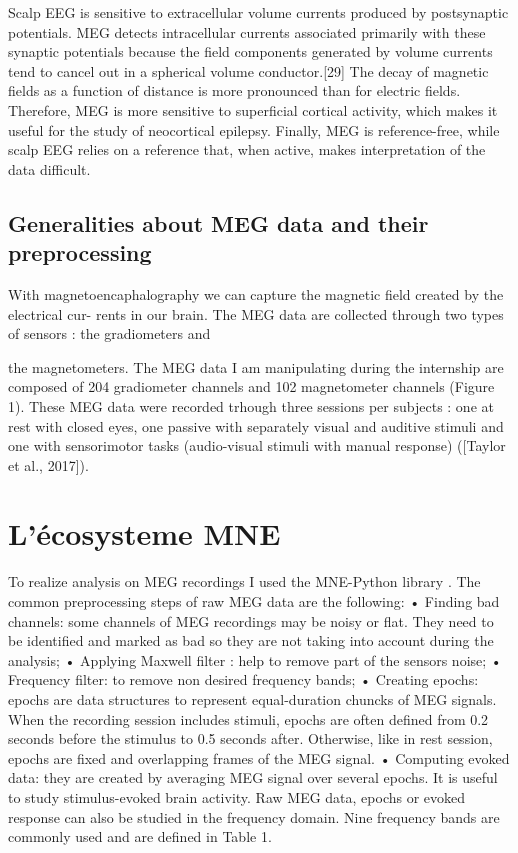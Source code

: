 Scalp EEG is sensitive to extracellular volume currents produced by postsynaptic potentials. MEG detects intracellular currents associated primarily with these synaptic potentials because the field components generated by volume currents tend to cancel out in a spherical volume conductor.[29] The decay of magnetic fields as a function of distance is more pronounced than for electric fields. Therefore, MEG is more sensitive to superficial cortical activity, which makes it useful for the study of neocortical epilepsy. Finally, MEG is reference-free, while scalp EEG relies on a reference that, when active, makes interpretation of the data difficult.


\subsection{Generalities about MEG data and their preprocessing}

With magnetoencaphalography we can capture the magnetic field created by the electrical cur-
rents in our brain. The MEG data are collected through two types of sensors : the gradiometers and

the magnetometers. The MEG data I am manipulating during the internship are composed of 204
gradiometer channels and 102 magnetometer channels (Figure 1). These MEG data were recorded
trhough three sessions per subjects : one at rest with closed eyes, one passive with separately visual
and auditive stimuli and one with sensorimotor tasks (audio-visual stimuli with manual response)
([Taylor et al., 2017]).


\section{L'écosysteme MNE}

To realize analysis on MEG recordings I used the MNE-Python library \cite{GramfortEtAl2013a}.
The common preprocessing steps of raw MEG data are the following:
• Finding bad channels: some channels of MEG recordings may be noisy or flat. They need to
be identified and marked as bad so they are not taking into account during the analysis;
• Applying Maxwell filter : help to remove part of the sensors noise;
• Frequency filter: to remove non desired frequency bands;
• Creating epochs: epochs are data structures to represent equal-duration chuncks of MEG
signals. When the recording session includes stimuli, epochs are often defined from 0.2 seconds
before the stimulus to 0.5 seconds after. Otherwise, like in rest session, epochs are fixed and
overlapping frames of the MEG signal.
• Computing evoked data: they are created by averaging MEG signal over several epochs. It is
useful to study stimulus-evoked brain activity.
Raw MEG data, epochs or evoked response can also be studied in the frequency domain. Nine
frequency bands are commonly used and are defined in Table 1.

